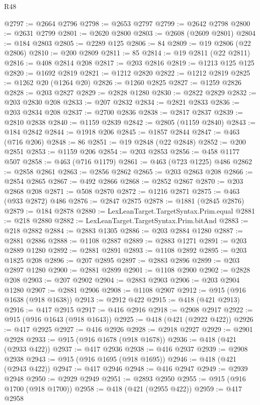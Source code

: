 \begin{lexlean}{R48}
\begin{coremodule}
@2797 := @2664 @2796
@2798 := @2653 @2797
@2799 := @2642 @2798
@2800 := @2631 @2799
@2801 := @2620 @2800
@2803 := @2608 (@2609 @2801)
@2804 := @184 @2803
@2805 := @2289 @125
@2806 := 84
@2809 := @19 @2806 (@22 @2806)
@2810 := @200 @2809
@2811 := 85
@2814 := @19 @2811 (@22 @2811)
@2816 := @408 @2814 @208
@2817 := @203 @2816
@2819 := @1213 @125 @125
@2820 := @1692 @2819
@2821 := @1212 @2820
@2822 := @1212 @2819
@2825 := @1262 @20 (@1264 @20)
@2826 := @1260 @2825
@2827 := @1259 @2826
@2828 := @203 @2827
@2829 := @2828 @1280
@2830 := @2822 @2829
@2832 := @203 @2830 @208
@2833 := @207 @2832
@2834 := @2821 @2833
@2836 := @203 @2834 @208
@2837 := @2700 @2836
@2838 := @2817 @2837
@2839 := @2810 @2838
@2840 := @1159 @2839
@2842 := @2805 (@1159 @2840)
@2843 := @184 @2842
@2844 := @1918 @206
@2845 := @1857 @2844
@2847 := @463 (@716 @206)
@2848 := 86
@2851 := @19 @2848 (@22 @2848)
@2852 := @200 @2851
@2853 := @1159 @206
@2854 := @203 @2853
@2856 := @458 @1177 @507
@2858 := @463 (@716 @1179)
@2861 := @463 (@723 @1225) @486
@2862 := @2858 @2861
@2863 := @2856 @2862
@2865 := @203 @2863 @208
@2866 := @2854 @2865
@2867 := @492 @2866
@2868 := @2852 @2867
@2870 := @203 @2868 @208
@2871 := @508 @2870
@2872 := @1216 @2871
@2875 := @463 (@933 @2872) @486
@2876 := @2847 @2875
@2878 := @1881 (@2845 @2876)
@2879 := @184 @2878
@2880 := LexLeanTarget.TargetSyntax.Prim.equal
@2881 := @218 @2880
@2882 := LexLeanTarget.TargetSyntax.Prim.bitAnd
@2883 := @218 @2882
@2884 := @2883 @1305
@2886 := @203 @2884 @1280
@2887 := @2881 @2886
@2888 := @1108 @2887
@2889 := @2883 @1271
@2891 := @203 @2889 @1280
@2892 := @2881 @2891
@2893 := @1108 @2892
@2895 := @203 @1825 @208
@2896 := @207 @2895
@2897 := @2883 @2896
@2899 := @203 @2897 @1280
@2900 := @2881 @2899
@2901 := @1108 @2900
@2902 := @2828 @208
@2903 := @207 @2902
@2904 := @2883 @2903
@2906 := @203 @2904 @1280
@2907 := @2881 @2906
@2908 := @1108 @2907
@2912 := @915 (@916 @1638 (@918 @1638))
@2913 := @2912 @422
@2915 := @418 (@421 @2913)
@2916 := @417 @2915
@2917 := @416 @2916
@2918 := @2908 @2917
@2922 := @915 (@916 @1643 (@918 @1643))
@2925 := @418 (@421 (@2922 @422))
@2926 := @417 @2925
@2927 := @416 @2926
@2928 := @2918 @2927
@2929 := @2901 @2928
@2933 := @915 (@916 @1678 (@918 @1678))
@2936 := @418 (@421 (@2933 @422))
@2937 := @417 @2936
@2938 := @416 @2937
@2939 := @2908 @2938
@2943 := @915 (@916 @1695 (@918 @1695))
@2946 := @418 (@421 (@2943 @422))
@2947 := @417 @2946
@2948 := @416 @2947
@2949 := @2939 @2948
@2950 := @2929 @2949
@2951 := @2893 @2950
@2955 := @915 (@916 @1700 (@918 @1700))
@2958 := @418 (@421 (@2955 @422))
@2959 := @417 @2958

\end{coremodule}
\end{lexlean}
